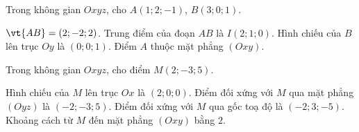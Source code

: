 \begin{bai}Trong không gian $Oxyz$, cho $A(1;2;-1)$, $B(3;0;1)$.
\begin{dungsai}
  \y $\vt{AB}=(2;-2;2)$. \oDS
  \y Trung điểm của đoạn $AB$ là $I(2;1;0)$. \oDS
  \y Hình chiếu của $B$ lên trục $Oy$ là $(0;0;1)$. \oDS
  \y Điểm $A$ thuộc mặt phẳng $(Oxy)$. \oDS
\end{dungsai}
\end{bai}
\begin{bai}Trong không gian $Oxyz$, cho điểm $M(2;-3;5)$.
\begin{dungsai}
  \y Hình chiếu của $M$ lên trục $Ox$ là $(2;0;0)$. \oDS
  \y Điểm đối xứng với $M$ qua mặt phẳng $(Oyz)$ là $(-2;-3;5)$. \oDS
  \y Điểm đối xứng với $M$ qua gốc toạ độ là $(-2;3;-5)$. \oDS
  \y Khoảng cách từ $M$ đến mặt phẳng $(Oxy)$ bằng $2$. \oDS
\end{dungsai}
\end{bai}

